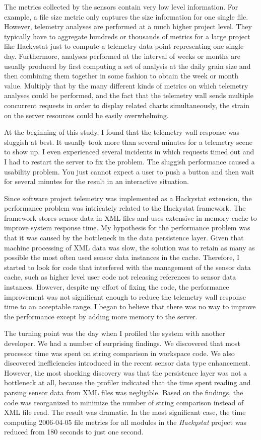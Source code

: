 The metrics collected by the sensors contain very low level information. For example, a file size metric only captures the size information for one single file. However, telemetry analyses are performed at a much higher project level. They typically have to aggregate hundreds or thousands of metrics for a large project like Hackystat just to compute a telemetry data point representing one single day. Furthermore, analyses performed at the interval of weeks or months are usually produced by first computing a set of analysis at the daily grain size and then combining them together in some fashion to obtain the week or month value. Multiply that by the many different kinds of metrics on which telemetry analyses could be performed, and the fact that the telemetry wall sends multiple concurrent requests in order to display related charts simultaneously, the strain on the server resources could be easily overwhelming. 

At the beginning of this study, I found that the telemetry wall response was sluggish at best. It usually took more than several minutes for a telemetry scene to show up. I even experienced several incidents in which requests timed out and I had to restart the server to fix the problem. The sluggish performance caused a usability problem. You just cannot expect a user to push a button and then wait for several minutes for the result in an interactive situation.

Since software project telemetry was implemented as a Hackystat extension, the performance problem was intricately related to the Hackystat framework. The framework stores sensor data in XML files and uses extensive in-memory cache to improve system response time. My hypothesis for the performance problem was that it was caused by the bottleneck in the data persistence layer. Given that machine processing of XML data was slow, the solution was to retain as many as possible the most often used sensor data instances in the cache. Therefore, I started to look for code that interfered with the management of the sensor data cache, such as higher level user code not releasing references to sensor data instances. However, despite my effort of fixing the code, the performance improvement was not significant enough to reduce the telemetry wall response time to an acceptable range. I began to believe that there was no way to improve the performance except by adding more memory to the server.

The turning point was the day when I profiled the system with another developer. We had a number of surprising findings. We discovered that most processor time was spent on string comparison in workspace code. We also discovered inefficiencies introduced in the recent sensor data type enhancement. However, the most shocking discovery was that the persistence layer was not a bottleneck at all, because the profiler indicated that the time spent reading and parsing sensor data from XML files was negligible. Based on the findings, the code was reorganized to minimize the number of string comparison instead of XML file read. The result was dramatic. In the most significant case, the time computing 2006-04-05 file metrics for all modules in the \textit{Hackystat} project was reduced from 180 seconds to just one second. 

